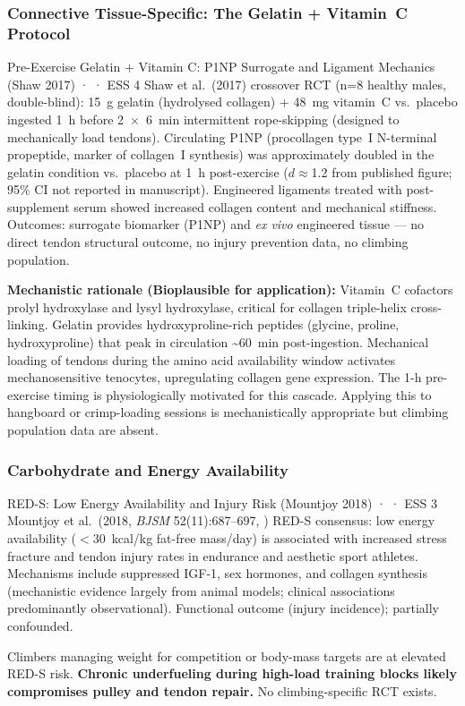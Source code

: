 \subsubsection*{Connective Tissue-Specific: The Gelatin + Vitamin~C Protocol}

\begin{evidencebox}{Pre-Exercise Gelatin + Vitamin C: P1NP Surrogate and Ligament Mechanics (Shaw 2017) · \evidencebacked · ESS 4}
Shaw et al.\ (2017) crossover RCT (n=8 healthy males, double-blind): 15~g gelatin (hydrolysed collagen) + 48~mg vitamin~C vs.\ placebo ingested 1~h before 2~$\times$~6~min intermittent rope-skipping (designed to mechanically load tendons). Circulating P1NP (procollagen type~I N-terminal propeptide, marker of collagen~I synthesis) was approximately doubled in the gelatin condition vs.\ placebo at 1~h post-exercise ($d\approx$1.2 from published figure; 95\% CI not reported in manuscript). Engineered ligaments treated with post-supplement serum showed increased collagen content and mechanical stiffness. Outcomes: surrogate biomarker (P1NP) and \emph{ex vivo} engineered tissue --- no direct tendon structural outcome, no injury prevention data, no climbing population. \cite{SLBR+17}

\textbf{Mechanistic rationale (Bioplausible for application):} Vitamin~C cofactors prolyl hydroxylase and lysyl hydroxylase, critical for collagen triple-helix cross-linking. Gelatin provides hydroxyproline-rich peptides (glycine, proline, hydroxyproline) that peak in circulation \textasciitilde{}60~min post-ingestion. Mechanical loading of tendons during the amino acid availability window activates mechanosensitive tenocytes, upregulating collagen gene expression. The 1-h pre-exercise timing is physiologically motivated for this cascade. Applying this to hangboard or crimp-loading sessions is mechanistically appropriate but climbing population data are absent.
\end{evidencebox}

\subsubsection*{Carbohydrate and Energy Availability}

\begin{evidencebox}{RED-S: Low Energy Availability and Injury Risk (Mountjoy 2018) · \evidencebacked · ESS 3}
Mountjoy et al.\ (2018, \emph{BJSM} 52(11):687--697, \cite{MSBB+18}) RED-S consensus: low energy availability ($<$30~kcal/kg fat-free mass/day) is associated with increased stress fracture and tendon injury rates in endurance and aesthetic sport athletes. Mechanisms include suppressed IGF-1, sex hormones, and collagen synthesis (mechanistic evidence largely from animal models; clinical associations predominantly observational). Functional outcome (injury incidence); partially confounded.

Climbers managing weight for competition or body-mass targets are at elevated RED-S risk. \textbf{Chronic underfueling during high-load training blocks likely compromises pulley and tendon repair.} No climbing-specific RCT exists.
\end{evidencebox}

